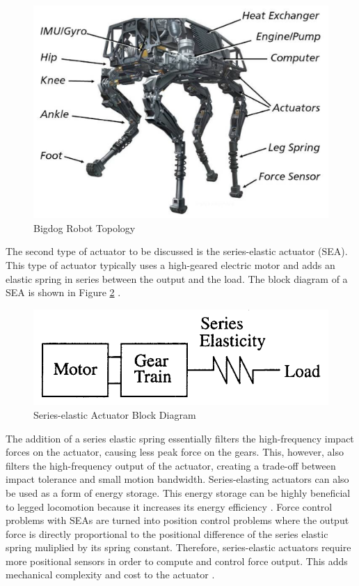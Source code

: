 \documentclass[english]{upeeei}
\begin{document}
\begin{figure}[H]
\begin{centering}
\includegraphics[width=0.5\columnwidth]{images/bigdog}
\par\end{centering}
\caption{Bigdog Robot Topology\label{fig:bigdog}}
\end{figure}

The second type of actuator to be discussed is the series-elastic actuator (SEA). This type of actuator typically uses a high-geared electric motor and adds an elastic spring in series between the output and the load. The block diagram of a SEA is shown in Figure \ref{fig:sea-block-diagram} \cite{sea}.

\begin{figure}[H]
\begin{centering}
\includegraphics[width=0.5\columnwidth]{images/sea_block_diagram}
\par\end{centering}
\caption{Series-elastic Actuator Block Diagram\label{fig:sea-block-diagram}}
\end{figure}

The addition of a series elastic spring essentially filters the high-frequency impact forces on the actuator, causing less peak force on the gears. This, however, also filters the high-frequency output of the actuator, creating a trade-off between impact tolerance and small motion bandwidth. Series-elasting actuators can also be used as a form of energy storage. This energy storage can be highly beneficial to legged locomotion because it increases its energy efficiency \cite{sea}. Force control problems with SEAs are turned into position control problems where the output force is directly proportional to the positional difference of the series elastic spring muliplied by its spring constant. Therefore, series-elastic actuators require more positional sensors in order to compute and control force output. This adds mechanical complexity and cost to the actuator \cite{minicheetah}.
\end{document}
